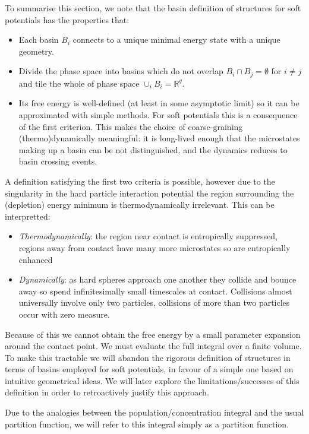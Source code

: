 \documentclass[11pt,twoside]{report}
\begin{document}
To summarise this section, we note that the basin definition of structures for soft potentials has the properties that: \cite{Wales?}
\begin{itemize}
\item Each basin $B_i$ connects to a unique minimal energy state with a unique geometry.
\item Divide the phase space into basins which do not overlap $B_i \cap B_j = \emptyset$ for $i \ne j$ and tile the whole of phase space $\cup_i B_i = \mathbb{R}^q$.
\item Its free energy is well-defined (at least in some asymptotic limit) so it can be approximated with simple methods.
  For soft potentials this is a consequence of the first criterion.
  This makes the choice of coarse-graining (thermo)dynamically meaningful: it is long-lived enough that the microstates making up a basin can be not distinguished, and the dynamics reduces to basin crossing events.
\end{itemize}
A definition satisfying the first two criteria is possible, however due to the singularity in the hard particle interaction potential the region surrounding the (depletion) energy minimum is thermodynamically irrelevant.
This can be interpretted:
\begin{itemize}
\item \emph{Thermodynamically}: the region near contact is entropically suppressed, regions away from contact have many more microstates so are entropically enhanced
\item \emph{Dynamically}: as hard spheres approach one another they collide and bounce away so spend infinitesimally small timescales at contact.
  Collisions almost universally involve only two particles, collisions of more than two particles occur with zero measure.
\end{itemize}
Because of this we cannot obtain the free energy by a small parameter expansion around the contact point.
We must evaluate the full integral over a finite volume.
To make this tractable we will abandon the rigorous definition of structures in terms of basins employed for soft potentials, in favour of a simple one based on intuitive geometrical ideas.
We will later explore the limitations/successes of this definition in order to retroactively justify this approach.

Due to the analogies between the population/concentration integral and the usual partition function, we will refer to this integral simply as a partition function.
\end{document}
